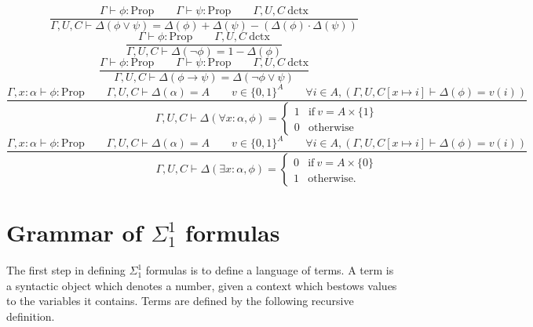 \documentclass[11pt]{article}
\begin{document}
\begin{equation}
	\frac{
		\Gamma \vdash \phi : \text{Prop}
		\qquad \Gamma \vdash \psi : \text{Prop}
		\qquad \Gamma,U,C\ \text{dctx}
	}{
		\Gamma,U,C \vdash \Delta(\phi \vee \psi)
		= \Delta(\phi) + \Delta(\psi) - (\Delta(\phi) \cdot \Delta(\psi))
	}
\end{equation}
\begin{equation}
	\frac{
		\Gamma \vdash \phi : \text{Prop}
		\qquad \Gamma,U,C\ \text{dctx}
	}{
		\Gamma,U,C \vdash \Delta(\neg\phi) = 1 - \Delta(\phi)
	}
\end{equation}
\begin{equation}
	\frac{
		\Gamma \vdash \phi : \text{Prop}
		\qquad \Gamma \vdash \psi : \text{Prop}
		\qquad \Gamma,U,C\ \text{dctx}
	}{
		\Gamma,U,C \vdash \Delta(\phi \to \psi) = \Delta(\neg\phi \vee \psi)
	}
\end{equation}
\begin{equation}
	\frac{
		\Gamma, x : \alpha \vdash \phi : \text{Prop}
		\qquad \Gamma,U,C \vdash \Delta(\alpha) = A
		\qquad v \in \{0,1\}^A
		\qquad \forall i \in A, (\Gamma,U,C[x \mapsto i] \vdash \Delta(\phi) = v(i))
	}{
		\Gamma,U,C \vdash \Delta(\forall x : \alpha, \phi) =
		\begin{cases}
			1 & \text{if}\ v = A \times \{1\} \\
			0 & \text{otherwise}
		\end{cases}
	}
\end{equation}
\begin{equation}
	\frac{
		\Gamma, x : \alpha \vdash \phi : \text{Prop}
		\qquad \Gamma,U,C \vdash \Delta(\alpha) = A
		\qquad v \in \{0,1\}^A
		\qquad \forall i \in A, (\Gamma,U,C[x \mapsto i] \vdash \Delta(\phi) = v(i))
	}{
		\Gamma,U,C \vdash \Delta(\exists x : \alpha, \phi) =
		\begin{cases}
			0 & \text{if}\ v = A \times \{0\} \\
			1 & \text{otherwise}.
		\end{cases}
	}
\end{equation}



\section{Grammar of $\Sigma^1_1$ formulas}

The first step in defining $\Sigma^1_1$ formulas is to define a language of
terms. A term is a syntactic object which denotes a number, given a context which
bestows values to the variables it contains. Terms are defined by the following
recursive definition.
\end{document}
